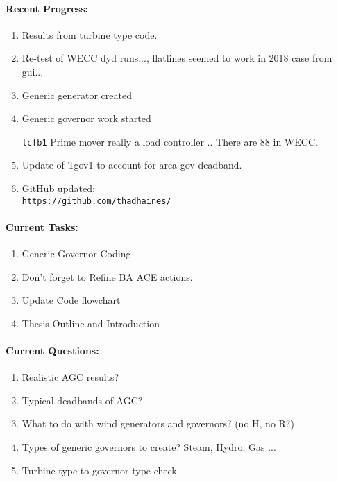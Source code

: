 \documentclass[12pt]{article}
\begin{document}
\begin{multicols}{2}
\raggedright
	\paragraph{Recent Progress:}
	\begin{enumerate}
		\item Results from turbine type code.
		\item Re-test of WECC dyd runs..., flatlines seemed to work in 2018 case from gui...
		\item Generic generator created
		\item Generic governor work started
		
			\subitem \verb|lcfb1| Prime mover really a load controller .. There are 88 in WECC.
			
		\item Update of Tgov1 to account for area gov deadband.


		\item GitHub updated:\\
		\verb|https://github.com/thadhaines/|
		
	\end{enumerate}
\paragraph{Current Tasks:}
	\begin{enumerate}
	
		\item Generic Governor Coding
		\item Don't forget to Refine BA ACE actions.
		\item Update Code flowchart%
		\item Thesis Outline and Introduction 
		
		

	\end{enumerate}

	\paragraph{Current Questions:}
	\begin{enumerate}
	\item Realistic AGC results?
	\item Typical deadbands of AGC? 
	\item What to do with wind generators and governors? (no H, no R?)
	\item Types of generic governors to create? Steam, Hydro, Gas ...
	\item Turbine type to governor type check
	

\end{enumerate}
\end{multicols}
\end{document}

